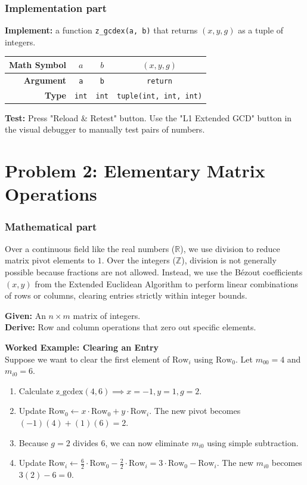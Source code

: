 \documentclass[11pt]{article}
\begin{document}
\subsubsection*{Implementation part}
\textbf{Implement:} a function \lstinline|z_gcdex(a, b)| that returns $(x, y, g)$ as a tuple of integers.
\begin{center}
\renewcommand{\arraystretch}{2.0}
\begin{tabular}{r | c | c | c }
\toprule
\textbf{Math Symbol} & $a$ & $b$ & $(x, y, g)$ \\ \midrule
\textbf{Argument} & \lstinline|a| & \lstinline|b| & \lstinline|return| \\ \midrule
\textbf{Type} & \lstinline|int| & \lstinline|int| & \lstinline|tuple(int, int, int)| \\
\bottomrule
\end{tabular}
\end{center}
\textbf{Test:} Press "Reload \& Retest" button. Use the "L1 Extended GCD" button in the visual debugger to manually test pairs of numbers.


\section*{Problem 2: Elementary Matrix Operations}

\subsubsection*{Mathematical part}
Over a continuous field like the real numbers ($\mathbb{R}$), we use division to reduce matrix pivot elements to $1$. Over the integers ($\mathbb{Z}$), division is not generally possible because fractions are not allowed. Instead, we use the Bézout coefficients $(x, y)$ from the Extended Euclidean Algorithm to perform linear combinations of rows or columns, clearing entries strictly within integer bounds.

\textbf{Given:} An $n \times m$ matrix of integers. \\
\textbf{Derive:} Row and column operations that zero out specific elements.

\vspace{0.5cm}
\noindent\textbf{Worked Example: Clearing an Entry} \\
Suppose we want to clear the first element of $\text{Row}_i$ using $\text{Row}_0$. Let $m_{00} = 4$ and $m_{i0} = 6$.
\begin{enumerate}
    \item Calculate $\text{z\_gcdex}(4, 6) \implies x = -1, y = 1, g = 2$.
    \item Update $\text{Row}_0 \leftarrow x\cdot\text{Row}_0 + y\cdot\text{Row}_i$. The new pivot becomes $(-1)(4) + (1)(6) = 2$.
    \item Because $g = 2$ divides $6$, we can now eliminate $m_{i0}$ using simple subtraction.
    \item Update $\text{Row}_i \leftarrow \frac{6}{2}\cdot\text{Row}_0 - \frac{2}{2}\cdot\text{Row}_i = 3\cdot\text{Row}_0 - \text{Row}_i$. The new $m_{i0}$ becomes $3(2) - 6 = 0$.
\end{enumerate}
\end{document}

